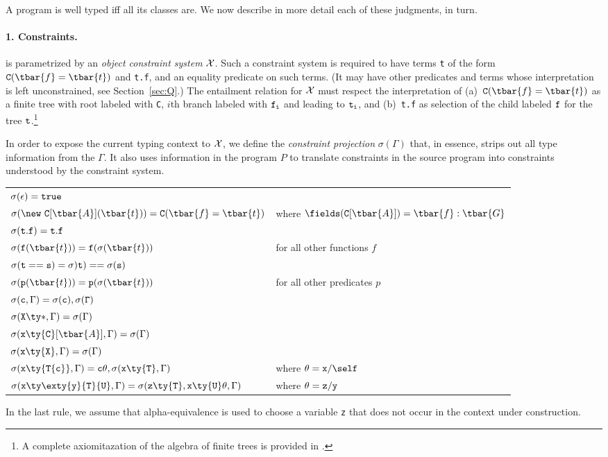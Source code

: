 A program is well typed iff all its classes are. We now describe in more detail each of these judgments, in turn. 


\paragraph{1. Constraints.}

{}\FXG{} is parametrized by an {\em object constraint system} $\cal
X$.  Such a constraint system is required to have terms {\tt t} of the
form ${\tt C}(\tbar{f}=\tbar{t})$ and {\tt t.f}, and an equality
predicate on such terms. (It may have other predicates and terms whose interpretation is left unconstrained, see Section~\ref{sec:Q}.)
The entailment relation for $\cal X$ must respect the interpretation of
(a)~${\tt C}(\tbar{f}=\tbar{t})$ as a finite tree with root
labeled with {\tt C}, $i$th branch labeled with $\tt f_i$ and leading to
$\tt t_i$, and (b)~{\tt t.f} as selection of the child labeled
$\tt f$ for the tree $\tt t$.\footnote{A complete axiomitazation of the algebra of finite trees is provided in \cite{maher-tree}.}

In order to expose the current typing context to $\cal X$, we define
the {\em constraint projection} $\sigma(\Gamma)$ that, in essence,
strips out all type information from the $\Gamma$. It also uses
information in the program $P$ to translate constraints in the source
program into constraints understood by the constraint system.
 
%
\begin{center}
\begin{tabular}{ll}
$\sigma(\epsilon)={\tt true}$\\
$\sigma(\new~{\tt C}[\tbar{A}](\tbar{t}))={\tt C}(\tbar{f}=\tbar{t})$ 
& where $\fields({\tt C}[\tbar{A}])=\tbar{f}:\tbar{G}$\\
$\sigma({\tt t.f}) = {\tt t.f}$\\
$\sigma({\tt f}(\tbar{t}))={\tt f}(\sigma(\tbar{t}))$ & for all other functions $f$\\
$\sigma({\tt t==s})=\sigma){\tt t})==\sigma(\tt {s})$\\
$\sigma({\tt p}(\tbar{t}))={\tt p}(\sigma(\tbar{t}))$ & for all other predicates $p$\\
$\sigma({\tt c},\Gamma) = \sigma(\tt c), \sigma(\Gamma)$\\
$\sigma({\tt X}\ty*, \Gamma)=\sigma(\Gamma)$\\
$\sigma({\tt x}\ty{\tt C}[\tbar{A}], \Gamma)=\sigma(\Gamma)$\\
$\sigma({\tt x}\ty{\tt X}, \Gamma)=\sigma(\Gamma)$\\
$\sigma({\tt x}\ty{\tt T\{c\}}, \Gamma)={\tt c}\theta,\sigma({\tt x}\ty{\tt T},\Gamma)$ & where $\theta={\tt x}/\self$\\
$\sigma({\tt x}\ty\exty{{\tt y}}{{\tt T}}{{\tt U}}, \Gamma)=\sigma({\tt z}\ty{\tt T}, {\tt x}\ty{\tt U}\theta,\Gamma)$ & where $\theta={\tt z}/{\tt y}$\\
\end{tabular}
\end{center}
%
In the last rule, we assume that alpha-equivalence is used to choose a variable {\tt z} that does not occur in the context under construction.

